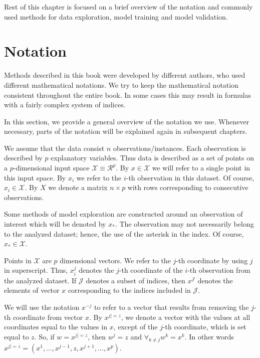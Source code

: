 \documentclass[]{krantz}
\begin{document}
Rest of this chapter is focused on a brief overview of the notation and commonly used methods for data exploration, model training and model validation.

\hypertarget{notation}{%
\section{Notation}\label{notation}}

Methods described in this book were developed by different authors, who used different mathematical notations.
We try to keep the mathematical notation consistent throughout the entire book. In some cases this may result in formulas with a fairly complex system of indices.

In this section, we provide a general overview of the notation we use. Whenever necessary, parts of the notation will be explained again in subsequent chapters.

We assume that the data consist \(n\) observations/instances. Each observation is described by \(p\) explanatory variables. Thus data is described as a set of points on a \(p\)-dimensional input space \(\mathcal X \equiv \mathcal R^p\). By \(x \in \mathcal X\) we will refer to a single point in this input space.
By \(x_i\) we refer to the \(i\)-th observation in this dataset. Of course, \(x_i \in \mathcal X\). By \(X\) we denote a matrix \(n\times p\) with rows corresponding to consecutive observations.

Some methods of model exploration are constructed around an observation of interest which will be denoted by \(x_{*}\). The observation may not necessarily belong to the analyzed dataset; hence, the use of the asterisk in the index. Of course, \(x_* \in \mathcal X\).

Points in \(\mathcal X\) are \(p\) dimensional vectors. We refer to the \(j\)-th coordinate by using \(j\) in superscript. Thus, \(x^j_i\) denotes the \(j\)-th coordinate of the \(i\)-th observation from the analyzed dataset. If \(\mathcal J\) denotes a subset of indices, then \(x^{\mathcal J}\) denotes the elements of vector \(x\) corresponding to the indices included in \(\mathcal J\).

We will use the notation \(x^{-j}\) to refer to a vector that results from removing the \(j\)-th coordinate from vector \(x\). By \textbf{\(x^{j|=z}\)}, we denote a vector with the values at all coordinates equal to the values in \(x\), except of the \(j\)-th coordinate, which is set equal to \(z\). So, if \(w=x^{j|=z}\), then \(w^j = z\) and \(\forall_{k\neq j} w^k = x^k\). In other words \(x^{j|=z} = (x^1, ..., x^{j-1}, z, x^{j+1}, ..., x^p)\).
\end{document}
